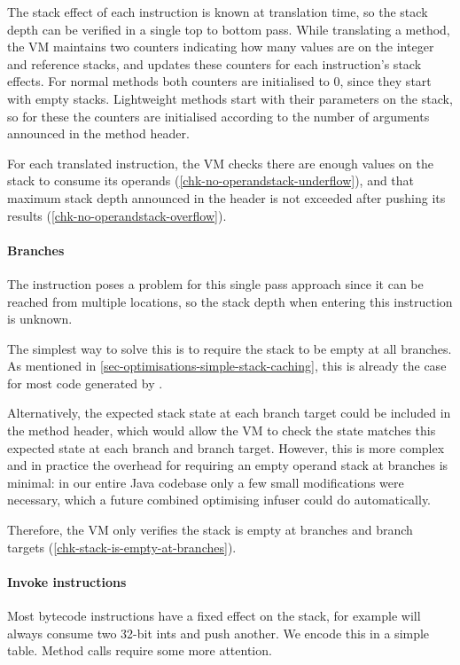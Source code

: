 The stack effect of each instruction is known at translation time, so the stack depth can be verified in a single top to bottom pass. While translating a method, the VM maintains two counters indicating how many values are on the integer and reference stacks, and updates these counters for each instruction's stack effects. For normal methods both counters are initialised to 0, since they start with empty stacks. Lightweight methods start with their parameters on the stack, so for these the counters are initialised according to the number of arguments announced in the method header.

For each translated instruction, the VM checks there are enough values on the stack to consume its operands (\ref{chk-no-operandstack-underflow}), and that maximum stack depth announced in the header is not exceeded after pushing its results (\ref{chk-no-operandstack-overflow}).

\paragraph{Branches}
The  instruction poses a problem for this single pass approach since it can be reached from multiple locations, so the stack depth when entering this instruction is unknown.

The simplest way to solve this is to require the stack to be empty at all branches. As mentioned in \ref{sec-optimisations-simple-stack-caching}, this is already the case for most code generated by .

Alternatively, the expected stack state at each branch target could be included in the method header, which would allow the VM to check the state matches this expected state at each branch and branch target. However, this is more complex and in practice the overhead for requiring an empty operand stack at branches is minimal: in our entire Java codebase only a few small modifications were necessary, which a future combined optimising infuser could do automatically.

Therefore, the VM only verifies the stack is empty at branches and branch targets (\ref{chk-stack-is-empty-at-branches}).

\paragraph{Invoke instructions}
Most bytecode instructions have a fixed effect on the stack, for example  will always consume two 32-bit ints and push another. We encode this in a simple table. Method calls require some more attention.

